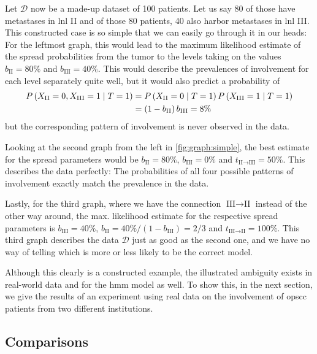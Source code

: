 \documentclass[\relativeRoot/main.tex]{subfiles}
\begin{document}
Let $\boldsymbol{\mathcal{D}}$ now be a made-up dataset of 100 patients. Let us say 80 of those have metastases in \gls{lnl} II and of those 80 patients, 40 also harbor metastases in \gls{lnl} III. This constructed case is so simple that we can easily go through it in our heads: For the leftmost graph, this would lead to the maximum likelihood estimate of the spread probabilities from the tumor to the levels taking on the values $b_\text{II} = 80\%$ and $b_\text{III} = 40\%$. This would describe the prevalences of involvement for each level separately quite well, but it would also predict a probability of
%
\begin{equation}
    \begin{aligned}
        P \left( X_\text{II}=0, X_\text{III}=1 \mid T=1 \right) &= P \left( X_\text{II}=0 \mid T=1 \right) P \left( X_\text{III}=1 \mid T=1 \right) \\
        &= \left( 1 - b_\text{II} \right) b_\text{III} = 8\%
    \end{aligned}
\end{equation}
%
but the corresponding pattern of involvement is never observed in the data.

Looking at the second graph from the left in \cref{fig:graph:simple}, the best estimate for the spread parameters would be $b_\text{II} = 80\%$, $b_\text{III} = 0\%$ and $t_{\text{II} \rightarrow \text{III}} = 50\%$. This describes the data perfectly: The probabilities of all four possible patterns of involvement exactly match the prevalence in the data.

Lastly, for the third graph, where we have the connection $\text{III} \rightarrow \text{II}$ instead of the other way around, the max. likelihood estimate for the respective spread parameters is $b_\text{III} = 40\%$, $b_\text{II} = 40\% / (1 - b_\text{III}) = 2/3$ and $t_{\text{III} \rightarrow \text{II}} = 100\%$. This third graph describes the data $\boldsymbol{\mathcal{D}}$ just as good as the second one, and we have no way of telling which is more or less likely to be the correct model.

Although this clearly is a constructed example, the illustrated ambiguity exists in real-world data and for the \gls{hmm} model as well. To show this, in the next section, we give the results of an experiment using real data on the involvement of \gls{opscc} patients from two different institutions.

\subsection{Comparisons}
\label{subsec:graph:simple:comp}


\end{document}

